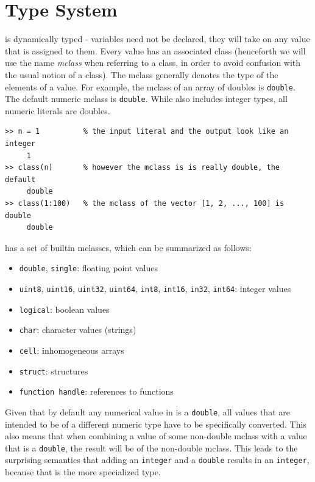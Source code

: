 \section{\matlab Type System}

\matlab is dynamically typed - variables need not be declared, they will
take on any value that is assigned to them.  Every \matlab value has
an associated \matlab class (henceforth we will use the name
\textit{mclass} when referring to a \matlab class, in order to avoid
confusion with the usual notion of a class).  The mclass generally denotes the 
type of the elements of a value.  For example, the mclass of an array of doubles
is {\tt double}.  The default numeric mclass is {\tt double}. While
\matlab also includes integer types, all numeric literals are doubles.

\begin{lstlisting}
>> n = 1          % the input literal and the output look like an integer
     1
>> class(n)       % however the mclass is is really double, the default 
     double
>> class(1:100)   % the mclass of the vector [1, 2, ..., 100] is double 
     double
\end{lstlisting}

\matlab has a set of builtin mclasses, which can be summarized as
follows: 
\begin{itemize}
     \item {\tt double}, {\tt single}: floating point values
     \item {\tt uint8}, {\tt uint16}, {\tt uint32}, {\tt uint64},
  {\tt int8}, {\tt int16}, {\tt in32}, {\tt int64}: integer values
     \item {\tt logical}: boolean values
     \item {\tt char}: character values (strings)
     \item {\tt cell}: inhomogeneous arrays
     \item {\tt struct}: structures
     \item {\tt function handle}: references to functions
\end{itemize}

Given that by default any numerical value in \matlab is a 
{\tt double}, all values that are intended to be of a different
numeric type have to be specifically converted. This also means that
when combining a value of some non-double mclass with a value
that is a {\tt double}, the result will be of the non-double 
mclass. This leads to the surprising semantics that adding an {\tt integer}
and a {\tt double} results in an {\tt integer}, because that is the more
specialized type.

